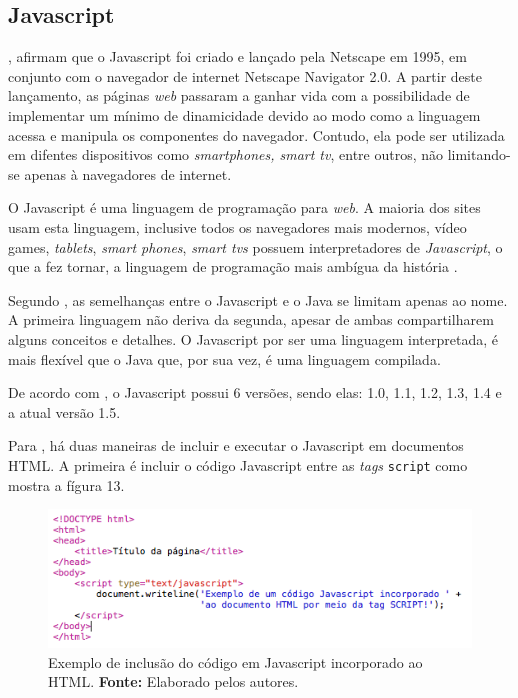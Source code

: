 \subsection{Javascript}

, afirmam que o Javascript foi criado e lançado pela Netscape em 1995, em conjunto com o navegador de internet Netscape Navigator 2.0. A partir deste lançamento, as páginas \textit{web} passaram a ganhar vida com a possibilidade de implementar um mínimo de dinamicidade devido ao modo como a linguagem acessa e manipula os componentes do navegador. Contudo, ela pode ser utilizada em difentes dispositivos como \textit{smartphones, smart tv}, entre outros, não limitando-se apenas à navegadores de internet.

O Javascript é uma linguagem de programação para \textit{web}. A maioria dos sites usam esta linguagem, inclusive todos os navegadores mais modernos, vídeo games, \textit{tablets}, \textit{smart phones}, \textit{smart tvs} possuem interpretadores de \textit{Javascript}, o que a fez tornar, a linguagem de programação mais ambígua da história \cite{flanagan_javascript_definitive_guide}.

Segundo , as semelhanças entre o Javascript e o Java se limitam apenas ao nome. A primeira linguagem não deriva da segunda, apesar de ambas compartilharem alguns conceitos e detalhes. O Javascript por ser uma linguagem interpretada, é mais flexível que o Java que, por sua vez, é uma linguagem compilada.

De acordo com , o Javascript possui 6 versões, sendo elas: 1.0, 1.1, 1.2, 1.3, 1.4 e a atual versão 1.5.

Para , há duas maneiras de incluir e executar o Javascript em documentos HTML. A primeira é incluir o código Javascript entre as \textit{tags} \texttt{script} como mostra a fígura 13. 

\begin{figure}[h!]
	\centerline{\includegraphics[scale=0.8]{./imagens/javascript_code.png}}
	\caption[Exemplo de inclusão do código em Javascript incorporado ao HTML]
	{Exemplo de inclusão do código em Javascript incorporado ao HTML. \textbf{Fonte:} Elaborado pelos autores.}
	\label{fig:exemplo1}
\end{figure}

